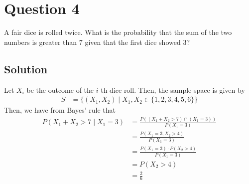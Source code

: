 \section*{Question 4}

A fair dice is rolled twice.
What is the probability that the sum of the two numbers is greater than 7 given that the first dice showed 3?

\subsection*{Solution}

Let \( X_i \) be the outcome of the \( i \)-th dice roll.
Then, the sample space is given by
\begin{align*}
    S & = \{ (X_1, X_2) \mid X_1, X_2 \in \{ 1, 2, 3, 4, 5, 6 \} \}
\end{align*}
Then, we have from Bayes' rule that
\begin{align*}
    P(X_1 + X_2 > 7 \mid X_1 = 3)
     & = \frac
    {P((X_1 + X_2 > 7) \cap (X_1 = 3))}
    {P(X_1 = 3)}
    \\
     & = \frac
    {P(X_1 = 3, X_2 > 4)}
    {P(X_1 = 3)}
    \\
     & = \frac
    {P(X_1 = 3) \cdot P(X_2 > 4)}
    {P(X_1 = 3)}
    \\
     & = P(X_2 > 4)
    \\
     & = \boxed{ \frac{2}{6} }
\end{align*}
